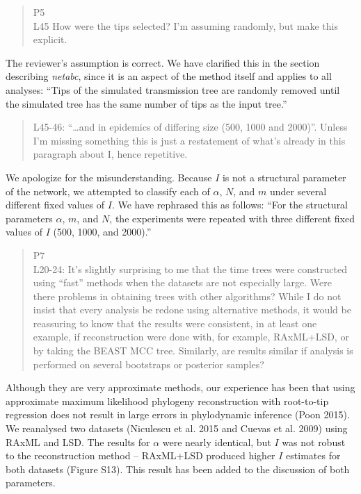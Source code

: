 \documentclass[12pt]{letter}
\begin{document}
\begin{letter}{ }
\begin{quote}
  \itshape

  P5 \\
  L45 How were the tips selected? I'm assuming randomly, but make this explicit.
\end{quote}

The reviewer's assumption is correct. We have clarified this in the section
describing \textit{netabc}, since it is an aspect of the method itself and
applies to all analyses: ``Tips of the simulated transmission tree are randomly
removed until the simulated tree has the same number of tips as the input
tree.''

\begin{quote}
  \itshape

  L45-46: ``\ldots and in epidemics of differing size (500, 1000 and 2000)''.
  Unless I'm missing something this is just a restatement of what's already in
  this paragraph about I, hence repetitive. 
\end{quote}

We apologize for the misunderstanding. Because $I$ is not a structural
parameter of the network, we attempted to classify each of $\alpha$, $N$, and
$m$ under several different fixed values of $I$. We have rephrased this as
follows: ``For the structural parameters $\alpha$, $m$, and $N$, the
experiments were repeated with three different fixed values of $I$ (500, 1000,
and 2000).''

\begin{quote}
  \itshape

  P7 \\
  L20-24: It's slightly surprising to me that the time trees were constructed
  using ``fast'' methods when the datasets are not especially large. Were there
  problems in obtaining trees with other algorithms? While I do not insist that
  every analysis be redone using alternative methods, it would be reassuring to
  know that the results were consistent, in at least one example, if
  reconstruction were done with, for example, RAxML+LSD, or by taking the BEAST
  MCC tree. Similarly, are results similar if analysis is performed on several
  bootstraps or posterior samples?
\end{quote}

Although they are very approximate methods, our experience has been that using
approximate maximum likelihood phylogeny reconstruction with root-to-tip
regression does not result in large errors in phylodynamic inference (Poon
2015). We reanalysed two datasets (Niculescu et al. 2015 and Cuevas et al.
2009) using RAxML and LSD. The results for $\alpha$ were nearly identical, but
$I$ was not robust to the reconstruction method -- RAxML+LSD produced higher
$I$ estimates for both datasets (Figure S13). This result has been added to the
discussion of both parameters.


\end{letter}
\end{document}
